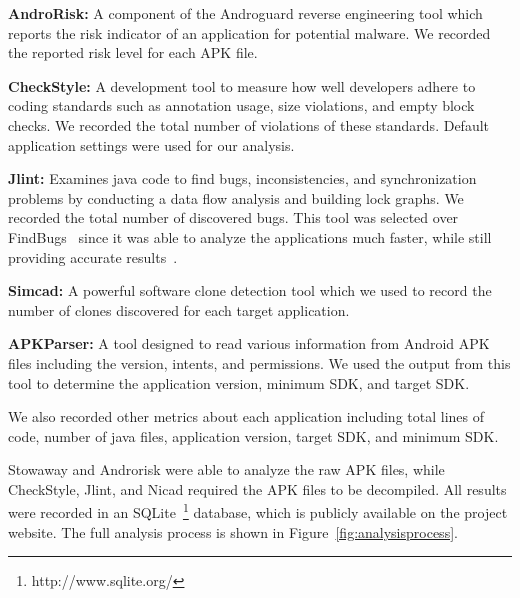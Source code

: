 \documentclass[conference]{IEEEtran}
\newcommand{\todo}[1]{\textcolor{cyan}{\textbf{[#1]}}}
\begin{document}
 \textbf{AndroRisk\cite{androguard_url}:} A component of the Androguard reverse engineering tool which reports the risk indicator of an application for potential malware. We recorded the reported risk level for each APK file.

 \textbf{CheckStyle\cite{checkstyle_key}:} A development tool to measure how well developers adhere to coding standards such as annotation usage, size violations, and empty block checks. We recorded the total number of violations of these standards. Default application settings were used for our analysis.

 \textbf{Jlint\cite{jlint_key}:} Examines java code to find bugs, inconsistencies, and synchronization problems by conducting a data flow analysis and building lock graphs. We recorded the total number of discovered bugs. This tool was selected over FindBugs~\cite{findbugs_key} since it was able to analyze the applications much faster, while still providing accurate results~\cite{rutar2004comparison}.

 \textbf{Simcad\cite{6613857}:} A powerful software clone detection tool which we used to record the number of clones discovered for each target application.

 \textbf{APKParser\cite{apkparser_link}:} A tool designed to read various information from Android APK files including the version, intents, and permissions. We used the output from this tool to determine the application version, minimum SDK, and target SDK.

We also recorded other metrics about each application including total lines of code, number of java files, application version, target SDK, and minimum SDK.



Stowaway and Androrisk were able to analyze the raw APK files, while CheckStyle, Jlint, and Nicad required the APK files to be decompiled. All results were recorded in an SQLite~\footnote{http://www.sqlite.org/} database, which is publicly available on the project website. The full analysis process is shown in Figure~\ref{fig:analysisprocess}.
\end{document}
